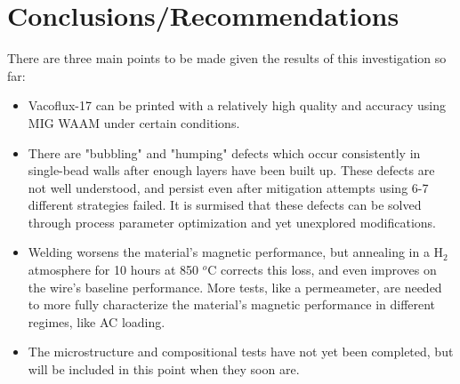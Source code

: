 \section{Conclusions/Recommendations}

There are three main points to be made given the results of this investigation so far:

\begin{itemize}
    \item Vacoflux-17 can be printed with a relatively high quality and accuracy using MIG WAAM under certain conditions.
    \item There are "bubbling" and "humping" defects which occur consistently in single-bead walls after enough layers have been built up. These defects are not well understood, and persist even after mitigation attempts using 6-7 different strategies failed. It is surmised that these defects can be solved through process parameter optimization and yet unexplored modifications.
    \item Welding worsens the material's magnetic performance, but annealing in a H$_2$ atmosphere for 10 hours at 850 $^o$C corrects this loss, and even improves on the wire's baseline performance. More tests, like a permeameter, are needed to more fully characterize the material's magnetic performance in different regimes, like AC loading.
    \item The microstructure and compositional tests have not yet been completed, but will be included in this point when they soon are.
\end{itemize}